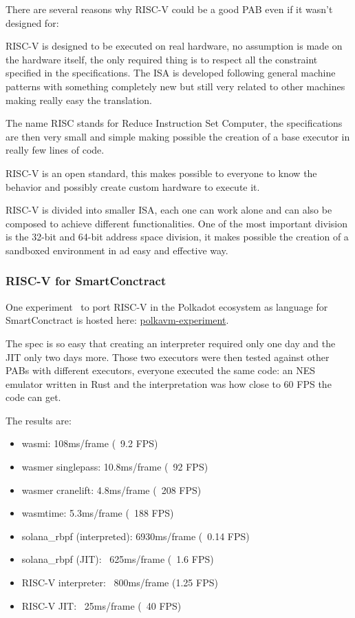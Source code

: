 \documentclass[../main.tex]{subfiles}
\begin{document}
There are several reasons why RISC-V could be a good PAB even if it wasn't designed for:
\begin{description}[style=nextline]
  \item[Real ISA suitable for direct native hardware implementation]
        RISC-V is designed to be executed on real hardware, no assumption is made on the hardware itself, the only required thing is to respect all the constraint specified in the specifications. The ISA is developed following general machine patterns with something completely new but still very related to other machines making really easy the translation.
  \item[RISC]
        The name RISC stands for Reduce Instruction Set Computer, the specifications are then very small and simple making possible the creation of a base executor in really few lines of code.
  \item[Completely open ISA]
        RISC-V is an open standard, this makes possible to everyone to know the behavior and possibly create custom hardware to execute it.
  \item[ISA separated into a small base integer ISA]
        RISC-V is divided into smaller ISA, each one can work alone and can also be composed to achieve different functionalities. One of the most important division is the 32-bit and 64-bit address space division, it makes possible the creation of a sandboxed environment in ad easy and effective way.
\end{description}

\subsubsection{RISC-V for SmartConctract}

One experiment~\cite{polkavm-forum} to port RISC-V in the Polkadot ecosystem as language for SmartConctract is hosted here: \href{https://github.com/koute/polkavm-experiment}{polkavm-experiment}.

The spec is so easy that creating an interpreter required only one day and the JIT only two days more. Those two executors were then tested against other PABs with different executors, everyone executed the same code: an NES emulator written in Rust and the interpretation was how close to 60 FPS the code can get.

The results are:
\begin{itemize}
    \item wasmi: 108ms/frame (~9.2 FPS)
    \item wasmer singlepass: 10.8ms/frame (~92 FPS)
    \item wasmer cranelift: 4.8ms/frame (~208 FPS)
    \item wasmtime: 5.3ms/frame (~188 FPS)
    \item solana\_rbpf (interpreted): 6930ms/frame (~0.14 FPS)
    \item solana\_rbpf (JIT): ~625ms/frame (~1.6 FPS)
    \item RISC-V interpreter: ~800ms/frame (1.25 FPS)
    \item RISC-V JIT: ~25ms/frame (~40 FPS)
\end{itemize}
\end{document}
